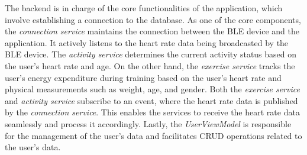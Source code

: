 The backend is in charge of the core functionalities of the application, which involve establishing a connection to the database.
As one of the core components, the \emph{connection service} maintains the connection between the BLE device and the application. It actively listens to the heart rate data being broadcasted by the BLE device. 
The \emph{activity service} determines the current activity status based on the user's heart rate and age. 
On the other hand, the \emph{exercise service} tracks the user's energy expenditure during training based on the user's heart rate and physical measurements such as weight, age, and gender. Both the \emph{exercise service} and \emph{activity service} subscribe to an event, where the heart rate data is published by the \emph{connection service}. This enables the services to receive the heart rate data seamlessly and process it accordingly.
Lastly, the \emph{UserViewModel} is responsible for the management of the user's data and facilitates CRUD operations related to the user's data.
